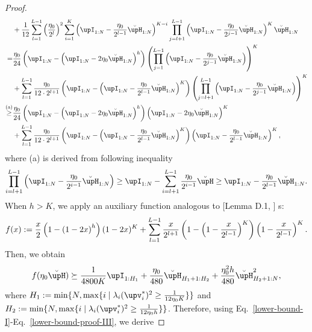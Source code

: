 \begin{proof}
\begin{align}
	&+\frac{1}{12}\sum_{l=1}^{L-1}\left(\frac{\eta_0}{2^l}\right)^2\sum_{i=1}^K\left(\upI_{1:N}-\frac{\eta_0}{2^{l-1}}\breve{\upH}_{1:N}\right)^{K-i}\prod_{j=l+1}^{L-1}\left(\upI_{1:N}-\frac{\eta_0}{2^{j-1}}\breve{\upH}_{1:N}\right)^K\breve{\upH}_{1:N}\notag
	\\
	=&\frac{\eta_0}{24}\left(\upI_{1:N}-\left(\upI_{1:N}-2\eta_0\breve{\upH}_{1:N}\right)^h\right)\left(\prod_{j=1}^{L-1}\left(\upI_{1:N}-\frac{\eta_0}{2^{j-1}}\breve{\upH}_{1:N}\right)\right)^K\notag
	\\
	&+\sum_{l=1}^{L-1}\frac{\eta_0}{12\cdot 2^{l+1}}\left(\upI_{1:N}-\left(\upI_{1:N}-\frac{\eta_0}{2^{l-1}}\breve{\upH}_{1:N}\right)^K\right)\left(\prod_{j=l+1}^{L-1}\left(\upI_{1:N}-\frac{\eta_0}{2^{j-1}}\breve{\upH}_{1:N}\right)\right)^K\notag
	\\
	\overset{\text{(a)}}{\geq}&\frac{\eta_0}{24}\left(\upI_{1:N}-\left(\upI_{1:N}-2\eta_0\breve{\upH}_{1:N}\right)^h\right)\left(\upI_{1:N}-2\eta_0\breve{\upH}_{1:N}\right)^K\notag
	\\
	&+\sum_{l=1}^{L-1}\frac{\eta_0}{12\cdot 2^{l+1}}\left(\upI_{1:N}-\left(\upI_{1:N}-\frac{\eta_0}{2^{l-1}}\breve{\upH}_{1:N}\right)^K\right)\left(\upI_{1:N}-\frac{\eta_0}{2^{l-1}}\breve{\upH}_{1:N}\right)^K,
    \end{align}
    where (a) is derived from following inequality
\begin{align}
	\prod_{i=l+1}^{L-1}\left(\upI_{1:N}-\frac{\eta_0}{2^{i-1}}\breve{\upH}_{1:N}\right)\geq\upI_{1:N}-\sum_{i=l+1}^{L-1}\frac{\eta_0}{2^{i-1}}\breve{\upH}\geq\upI_{1:N}-\frac{\eta_0}{2^{l-1}}\breve{\upH}_{1:N}.\notag
\end{align}
When $h > K$, we apply an auxiliary function analogous to [Lemma D.1, \citet{wu2022last}] s:
\begin{align}
    f(x):=\frac{x}{2}\left(1-\left(1-2x\right)^h\right)(1-2x)^K+\sum_{l=1}^{L-1}\frac{x}{2^{l+1}}\left(1-\left(1-\frac{x}{2^{l-1}}\right)^K\right)\left(1-\frac{x}{2^{l-1}}\right)^K.\notag
\end{align}
Then, we obtain
\begin{align}\label{lower-bound-proof-III}
    f(\eta_0\breve{\upH})\succeq\frac{1}{4800K}\upI_{1:H_1}+\frac{\eta_0}{480}\breve{\upH}_{H_1+1:H_2}+\frac{\eta_0^2h}{480}\breve{\upH}_{H_2+1:N}^2,
\end{align}
where $H_1:=\min\{N,\max\{i\mid\lambda_i(\upv_i^*)^2\geq\frac{1}{12\eta_0K}\}\}$ and $H_2:=\min\{N,\max\{i\mid\lambda_i(\upv_i^*)^2\geq\frac{1}{12\eta_0h}\}\}$. Therefore, using Eq.~\eqref{lower-bound-I}-Eq.~\eqref{lower-bound-proof-III}, we derive 

\end{proof}
